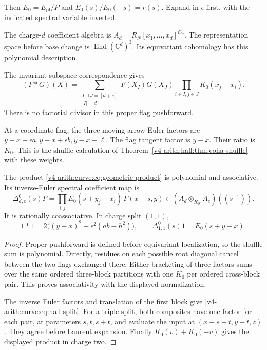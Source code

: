 Then $E_0=E_{\mathrm{pl}}/P$ and $E_0(s)/E_0(-s)=r(s)$.
Expand in $\epsilon$ first, with the indicated spectral
variable inverted.

The charge-$d$ coefficient algebra is
$A_d=R_N[x_1,\ldots,x_d]^{\mathfrak S_d}$.
The representation space before base change is
$\operatorname{End}(\mathbb C^d)^3$. Its equivariant cohomology
has this polynomial description.

The invariant-subspace correspondence gives
\begin{equation}\label{v4-arith:curve:eq:geometric-product}
 (F*G)(X)=
 \sum_{\substack{I\sqcup J=[d+e]\\|I|=d}}
 F(X_I)G(X_J)\prod_{i\in I,j\in J}K_0(x_j-x_i).
\end{equation}
There is no factorial divisor in this proper flag pushforward.

At a coordinate flag, the three moving arrow Euler factors
are $y-x+\epsilon a,y-x+\epsilon b,y-x-\ell$.
The flag tangent factor is $y-x$. Their ratio is $K_0$.
This is the shuffle calculation of
Theorem~\ref{v4-arith:hall:thm:coha-shuffle} with these weights.

\begin{proposition}\label{v4-arith:curve:prop:geometric-hall}
The product \eqref{v4-arith:curve:eq:geometric-product} is
polynomial and associative. Its inverse-Euler spectral
coefficient map is
\begin{equation}\label{v4-arith:curve:eq:hall-split}
 \Delta^0_{d,e}(s)F
 =\prod_{i,j}E_0(s+y_j-x_i)\,F(x-s,y)
 \in(A_d\otimes_{R_N}A_e)((s^{-1})).
\end{equation}
It is rationally coassociative. In charge split $(1,1)$,
\[
 1*1=2\bigl((y-x)^2+\epsilon^2(ab-h^2)\bigr),\qquad
 \Delta^0_{1,1}(s)1=E_0(s+y-x).
\]
\end{proposition}
\begin{proof}
Proper pushforward is defined before equivariant localization,
so the shuffle sum is polynomial. Directly, residues on each
possible root diagonal cancel between the two flags exchanged
there. Either bracketing of three factors sums over the same
ordered three-block partitions with one $K_0$ per ordered
cross-block pair. This proves associativity with the displayed
normalization.

The inverse Euler factors and translation of the first block
give \eqref{v4-arith:curve:eq:hall-split}.
For a triple split, both composites have one factor for each
pair, at parameters $s,t,s+t$, and evaluate the input at
$(x-s-t,y-t,z)$. They agree before Laurent expansion.
Finally $K_0(v)+K_0(-v)$ gives the displayed product in
charge two.
\end{proof}

